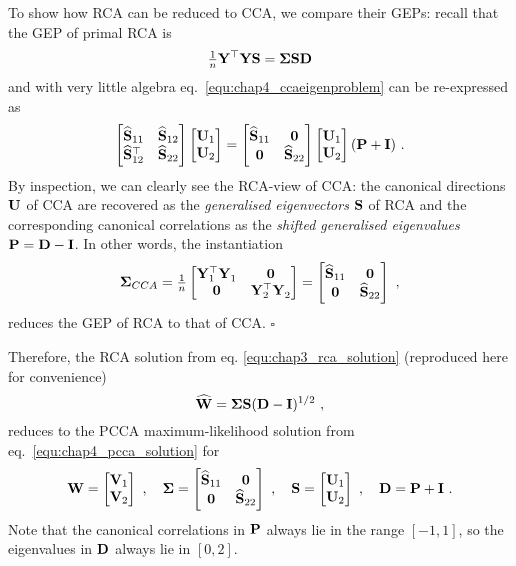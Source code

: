       To show how RCA can be reduced to CCA, we compare their GEPs: recall that the GEP of primal RCA is
      \begin{equation*}
	\tfrac{1}{n} \mathbf{Y^\top} \mathbf{Y} \mathbf{S} = \mathbf{\Sigma} \mathbf{S} \mathbf{D}
      \end{equation*}
      and with very little algebra eq.~\eqref{equ:chap4_ccaeigenproblem} can be re-expressed as
      \begin{equation} \label{equ:chap4_ccaform2}
	\begin{bmatrix}  \widehat{\mathbf{S}}_{11} &\widehat{\mathbf{S}}_{12} \\ \widehat{\mathbf{S}}_{12}^\top &\widehat{\mathbf{S}}_{22}  \end{bmatrix}
	\begin{bmatrix}  \mathbf{U}_1 \\ \mathbf{U}_2  \end{bmatrix} = \begin{bmatrix}  \widehat{\mathbf{S}}_{11} & \mathbf{0} \\ \mathbf{0} &\widehat{\mathbf{S}}_{22}  \end{bmatrix}
	\begin{bmatrix}  \mathbf{U}_1 \\ \mathbf{U}_2  \end{bmatrix} ( \mathbf{P} + \mathbf{I} ) ~.
      \end{equation}
      By inspection, we can clearly see the RCA-view of CCA: the canonical directions $\mathbf{U}$ of CCA are recovered as the \emph{generalised eigenvectors} $\mathbf{S}$ of RCA and the corresponding canonical correlations as the \emph{shifted generalised eigenvalues} $\mathbf{P} = \mathbf{D-I}$.
      In other words, the instantiation
      \begin{equation}
	\mathbf{\Sigma}_{CCA} = \tfrac{1}{n} \begin{bmatrix}  \mathbf{Y}_1^\top \mathbf{Y}_1^{~} &\mathbf{0} \\ \mathbf{0} &\mathbf{Y}_2^\top\mathbf{Y}_2^{~}  \end{bmatrix}
	= \begin{bmatrix}  \widehat{\mathbf{S}}_{11} & \mathbf{0} \\ \mathbf{0} &\widehat{\mathbf{S}}_{22}  \end{bmatrix} ~,
      \end{equation}
      reduces the GEP of RCA to that of CCA. \hspace*{\fill} $\square$

      Therefore, the RCA solution from eq. \eqref{equ:chap3_rca_solution} (reproduced here for convenience)
      \[
	\widehat{\mathbf{W}} = \mathbf{\Sigma} \mathbf{S} (\mathbf{D - I})^{1/2} ~,
      \]
      reduces to the PCCA maximum-likelihood solution from eq.~\eqref{equ:chap4_pcca_solution} for
      \[
	\mathbf{W} = \begin{bmatrix}  \mathbf{V}_{1} \\ \mathbf{V}_{2}  \end{bmatrix} ~, \quad
	\mathbf{\Sigma} = \begin{bmatrix}  \widehat{\mathbf{S}}_{11} &\mathbf{0} \\ \mathbf{0} &\widehat{\mathbf{S}}_{22}  \end{bmatrix} ~, \quad
	\mathbf{S} = \begin{bmatrix}  \mathbf{U}_{1} \\ \mathbf{U}_{2}  \end{bmatrix} ~, \quad \mathbf{D} = \mathbf{P} + \mathbf{I} ~.
      \]
      Note that the canonical correlations in $\mathbf{P}$ always lie in the range $[-1,1]$, so the eigenvalues in $\mathbf{D}$ always lie in $[0,2]$.


